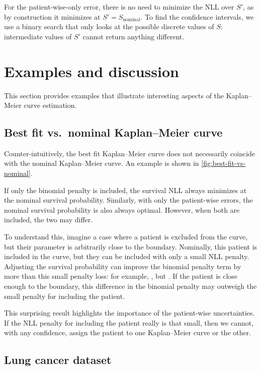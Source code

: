 \documentclass[article]{jss}
\begin{document}
For the patient-wise-only error, there is no need to minimize the NLL over \(S'\), as by construction it minimizes at \(S'=S_\text{nominal}\).  To find the confidence intervals, we use a binary search that only looks at the possible discrete values of \(S\): intermediate values of \(S'\) cannot return anything different.

\section{Examples and discussion}

This section provides examples that illustrate interesting aspects of the Kaplan--Meier curve estimation.

\subsection[Best fit vs. nominal Kaplan--Meier curve]{Best fit vs.\ nominal Kaplan--Meier curve}

Counter-intuitively, the best fit Kaplan--Meier curve does not necessarily coincide with the nominal Kaplan--Meier curve.  An example is shown in \cref{fig:best-fit-vs-nominal}.

If only the binomial penalty is included, the survival NLL always minimizes at the nominal survival probability.  Similarly, with only the patient-wise errors, the nominal survival probability is also always optimal.  However, when both are included, the two may differ.

To understand this, imagine a case where a patient is excluded from the curve, but their parameter is arbitrarily close to the boundary.  Nominally, this patient is included in the curve, but they can be included with only a small NLL penalty.  Adjusting the survival probability can improve the binomial penalty term by more than this small penalty loss: for example, , but .  If the patient is close enough to the boundary, this difference in the binomial penalty may outweigh the small penalty for including the patient.

This surprising result highlights the importance of the patient-wise uncertainties.  If the NLL penalty for including the patient really is that small, then we cannot, with any confidence, assign the patient to one Kaplan--Meier curve or the other.

\subsection{Lung cancer dataset}
\end{document}
